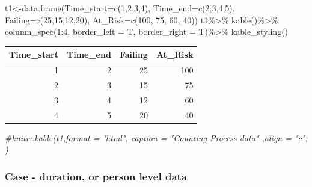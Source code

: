 \documentclass[
]{article}
\newenvironment{Shaded}{\begin{snugshade}}{\end{snugshade}}
\newcommand{\AttributeTok}[1]{\textcolor[rgb]{0.77,0.63,0.00}{#1}}
\newcommand{\CommentTok}[1]{\textcolor[rgb]{0.56,0.35,0.01}{\textit{#1}}}
\newcommand{\DecValTok}[1]{\textcolor[rgb]{0.00,0.00,0.81}{#1}}
\newcommand{\FunctionTok}[1]{\textcolor[rgb]{0.00,0.00,0.00}{#1}}
\newcommand{\NormalTok}[1]{#1}
\newcommand{\OtherTok}[1]{\textcolor[rgb]{0.56,0.35,0.01}{#1}}
\newcommand{\SpecialCharTok}[1]{\textcolor[rgb]{0.00,0.00,0.00}{#1}}
\begin{document}
\begin{Shaded}
\begin{Highlighting}[]
\NormalTok{t1}\OtherTok{\textless{}{-}}\FunctionTok{data.frame}\NormalTok{(}\AttributeTok{Time\_start=}\FunctionTok{c}\NormalTok{(}\DecValTok{1}\NormalTok{,}\DecValTok{2}\NormalTok{,}\DecValTok{3}\NormalTok{,}\DecValTok{4}\NormalTok{),}
               \AttributeTok{Time\_end=}\FunctionTok{c}\NormalTok{(}\DecValTok{2}\NormalTok{,}\DecValTok{3}\NormalTok{,}\DecValTok{4}\NormalTok{,}\DecValTok{5}\NormalTok{),}
               \AttributeTok{Failing=}\FunctionTok{c}\NormalTok{(}\DecValTok{25}\NormalTok{,}\DecValTok{15}\NormalTok{,}\DecValTok{12}\NormalTok{,}\DecValTok{20}\NormalTok{),}
               \AttributeTok{At\_Risk=}\FunctionTok{c}\NormalTok{(}\DecValTok{100}\NormalTok{, }\DecValTok{75}\NormalTok{, }\DecValTok{60}\NormalTok{, }\DecValTok{40}\NormalTok{))}
\NormalTok{t1}\SpecialCharTok{\%\textgreater{}\%}
  \FunctionTok{kable}\NormalTok{()}\SpecialCharTok{\%\textgreater{}\%}
  \FunctionTok{column\_spec}\NormalTok{(}\DecValTok{1}\SpecialCharTok{:}\DecValTok{4}\NormalTok{, }\AttributeTok{border\_left =}\NormalTok{ T, }\AttributeTok{border\_right =}\NormalTok{ T)}\SpecialCharTok{\%\textgreater{}\%}
  \FunctionTok{kable\_styling}\NormalTok{()}
\end{Highlighting}
\end{Shaded}

\begin{table}
\centering
\begin{tabular}{|>{}r|||>{}r|||>{}r|||>{}r|}
\hline
Time\_start & Time\_end & Failing & At\_Risk\\
\hline
1 & 2 & 25 & 100\\
\hline
2 & 3 & 15 & 75\\
\hline
3 & 4 & 12 & 60\\
\hline
4 & 5 & 20 & 40\\
\hline
\end{tabular}
\end{table}

\begin{Shaded}
\begin{Highlighting}[]
\CommentTok{\#knitr::kable(t1,format = "html", caption = "Counting Process data" ,align = "c", )}
\end{Highlighting}
\end{Shaded}

\hypertarget{case---duration-or-person-level-data}{%
\subsubsection{Case - duration, or person level data}\label{case---duration-or-person-level-data}}
\end{document}
